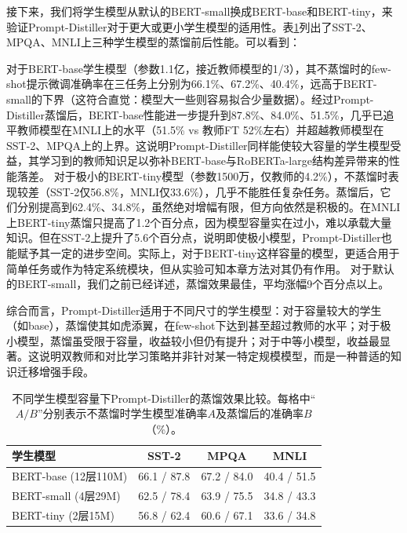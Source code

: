 \documentclass[../main.tex]{subfiles}
\begin{document}

接下来，我们将学生模型从默认的BERT-small换成BERT-base和BERT-tiny，来验证Prompt-Distiller对于更大或更小学生模型的适用性。表\ref{tab:model-scale}列出了SST-2、MPQA、MNLI上三种学生模型的蒸馏前后性能。可以看到：

对于BERT-base学生模型（参数1.1亿，接近教师模型的1/3），其不蒸馏时的few-shot提示微调准确率在三任务上分别为66.1\%、67.2\%、40.4\%，远高于BERT-small的下界（这符合直觉：模型大一些则容易拟合少量数据）。经过Prompt-Distiller蒸馏后，BERT-base性能进一步提升到87.8\%、84.0\%、51.5\%，几乎已追平教师模型在MNLI上的水平（51.5\% vs 教师FT 52\%左右）并超越教师模型在SST-2、MPQA上的上界。这说明Prompt-Distiller同样能使较大容量的学生模型受益，其学习到的教师知识足以弥补BERT-base与RoBERTa-large结构差异带来的性能落差。
对于极小的BERT-tiny模型（参数1500万，仅教师的4.2\%），不蒸馏时表现较差（SST-2仅56.8\%，MNLI仅33.6\%），几乎不能胜任复杂任务。蒸馏后，它们分别提高到62.4\%、34.8\%，虽然绝对增幅有限，但方向依然是积极的。在MNLI上BERT-tiny蒸馏只提高了1.2个百分点，因为模型容量实在过小，难以承载大量知识。但在SST-2上提升了5.6个百分点，说明即使极小模型，Prompt-Distiller也能赋予其一定的进步空间。实际上，对于BERT-tiny这样容量的模型，更适合用于简单任务或作为特定系统模块，但从实验可知本章方法对其仍有作用。
对于默认的BERT-small，我们之前已经详述，蒸馏效果最佳，平均涨幅9个百分点以上。

综合而言，Prompt-Distiller适用于不同尺寸的学生模型：对于容量较大的学生（如base），蒸馏使其如虎添翼，在few-shot下达到甚至超过教师的水平；对于极小模型，蒸馏虽受限于容量，收益较小但仍有提升；对于中等小模型，收益最显著。这说明双教师和对比学习策略并非针对某一特定规模模型，而是一种普适的知识迁移增强手段。

\begin{table}[htbp]
	\centering
	\caption{不同学生模型容量下Prompt-Distiller的蒸馏效果比较。每格中“$A/B$”分别表示不蒸馏时学生模型准确率$A$及蒸馏后的准确率$B$（\%）。}
	\label{tab:model-scale}
	\small\begin{tabular}{l|ccc}
		\toprule[1pt]
		\textbf{学生模型}       & \textbf{SST-2} & \textbf{MPQA} & \textbf{MNLI} \\
		\midrule[0.5pt]
		BERT-base (12层110M) & 66.1 / 87.8    & 67.2 / 84.0   & 40.4 / 51.5   \\
		BERT-small (4层29M)  & 62.5 / 78.4    & 63.9 / 75.5   & 34.8 / 43.3   \\
		BERT-tiny (2层15M)   & 56.8 / 62.4    & 60.6 / 67.1   & 33.6 / 34.8   \\
		\bottomrule[1pt]
	\end{tabular}
\end{table}
\end{document}
